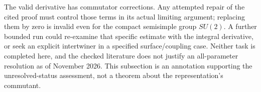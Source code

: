 The valid derivative has commutator corrections. Any attempted repair of the cited proof must control those terms in its actual limiting argument; replacing them by zero is invalid even for the compact semisimple group \(SU(2)\). A further bounded run could re-examine that specific estimate with the integral derivative, or seek an explicit intertwiner in a specified surface/coupling case. Neither task is completed here, and the checked literature does not justify an all-parameter resolution as of November 2026. This subsection is an annotation supporting the unresolved-status assessment, not a theorem about the representation's commutant.

